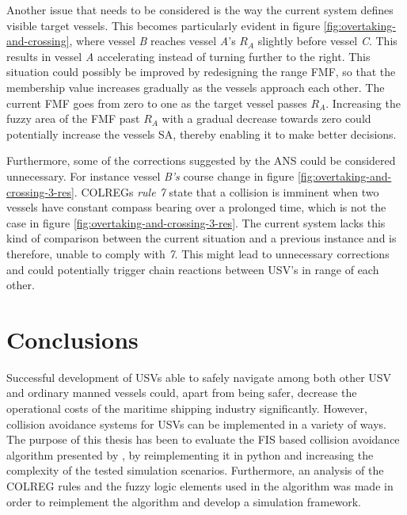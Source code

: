 Another issue that needs to be considered is the way the current system defines visible target vessels. This becomes particularly evident in figure \ref{fig:overtaking-and-crossing}, where vessel \textit{B} reaches vessel \textit{A}'s $R_A$ slightly before vessel \textit{C}. This results in vessel \textit{A} accelerating instead of turning further to the right. This situation could possibly be improved by redesigning the range FMF, so that the membership value increases gradually as the vessels approach each other. The current FMF goes from zero to one as the target vessel passes $R_A$. Increasing the fuzzy area of the FMF past $R_A$ with a gradual decrease towards zero could potentially increase the vessels SA, thereby enabling it to make better decisions.

Furthermore, some of the corrections suggested by the ANS could be considered unnecessary. For instance vessel \textit{B's} course change in figure \ref{fig:overtaking-and-crossing-3-res}. COLREGs \textit{rule 7} state that a collision is imminent when two vessels have constant compass bearing over a prolonged time, which is not the case in figure \ref{fig:overtaking-and-crossing-3-res}. The current system lacks this kind of comparison between the  current situation and a previous instance and is therefore, unable to comply with \textit{7}. This might lead to unnecessary corrections and could potentially trigger chain reactions between USV's in range of each other.


\chapter{Conclusions}%
\label{chap:conc}

Successful development of USVs able to safely navigate among both other USV and ordinary manned vessels could, apart from being safer,  decrease the operational costs of the maritime shipping industry significantly. However, collision avoidance systems for USVs can be implemented in a variety of ways. The purpose of this thesis has been to evaluate the FIS based collision avoidance algorithm presented by \textcite{perera2012intelligent,perera2010smooth_param}, by reimplementing it in python and increasing the complexity of the tested simulation scenarios. Furthermore, an analysis of the COLREG rules and the fuzzy logic elements used in the algorithm was made in order to reimplement the algorithm and  develop a simulation framework.

